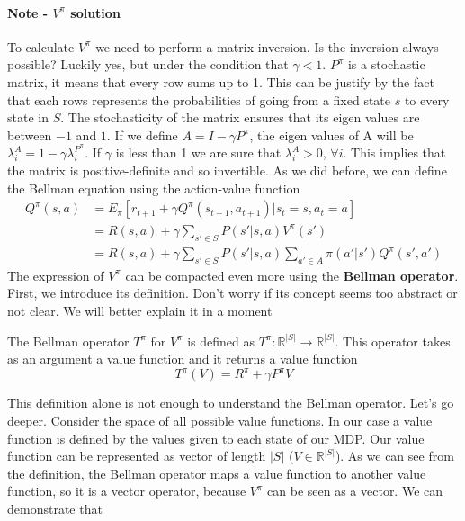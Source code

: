 \documentclass[main.tex]{subfiles}
\begin{document}
\paragraph{Note - $V^{\pi}$ solution} To calculate $V^{\pi}$ we need to perform a matrix inversion. Is the inversion always possible? Luckily yes, but under the condition that $\gamma<1$. $P^{\pi}$ is a stochastic matrix, it means that every row sums up to 1. This can be justify by the fact that each rows represents the probabilities of going from a fixed state $s$ to every state in $S$. The stochasticity of the matrix ensures that its eigen values are between $-1$ and $1$. If we define $A = I - \gamma P^{\pi}$, the eigen values of A will be $\lambda_i^A = 1 - \gamma \lambda_i^{P^{\pi}}$. If $\gamma$ is less than 1 we are sure that $\lambda_i^A > 0$, $\forall i$. This implies that the matrix is positive-definite and so invertible.
\newline
\newline
As we did before, we can define the Bellman equation using the action-value function
\begin{align*}
    Q^{\pi}(s,a) &= E_{\pi}[r_{t+1} + \gamma Q^{\pi}(s_{t+1},a_{t+1})|s_t=s,a_t=a] \\
    &= R(s,a) + \gamma \sum_{s' \in S} P(s'|s,a)V^{\pi}(s') \\
    &= R(s,a) + \gamma \sum_{s' \in S} P(s'|s,a) \sum_{a' \in A} \pi(a'|s')Q^{\pi}(s',a')
\end{align*}
The expression of $V^{\pi}$ can be compacted even more using the \textbf{Bellman operator}.
First, we introduce its definition. Don't worry if its concept seems too abstract or not clear. We will better explain it in a moment
\begin{definition}
The Bellman operator $T^{\pi}$ for $V^{\pi}$ is defined as $T^{\pi}:\mathbb{R}^{|S|} \rightarrow \mathbb{R}^{|S|}$. This operator takes as an argument a value function and it returns a value function \footnotemark {}
\begin{equation*}
    T^{\pi}(V) = R^{\pi} + \gamma P^{\pi} V
\end{equation*}
\end{definition}
This definition alone is not enough to understand the Bellman operator. Let's go deeper. Consider the space of all possible value functions. In our case a value function is defined by the values given to each state of our MDP. Our value function can be represented as vector of length $|S|$ ($V \in \mathbb{R}^{|S|}$). As we can see from the definition, the Bellman operator maps a value function to another value function, so it is a vector operator, because $V^{\pi}$ can be seen as a vector. We can demonstrate that
\end{document}

